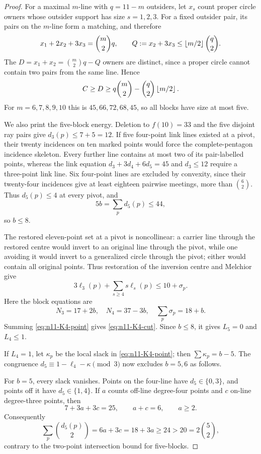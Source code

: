 \begin{proof}
For a maximal $m$-line with $q=11-m$ outsiders, let $x_s$ count proper
circle owners whose outsider support has size $s=1,2,3$.  For a fixed
outsider pair, its pairs on the $m$-line form a matching, and therefore
\[
x_1+2x_2+3x_3=\binom m2q,\qquad
Q:=x_2+3x_3\le\left\lfloor m/2\right\rfloor\binom q2.
\]
The $D=x_1+x_2=\binom m2q-Q$ owners are distinct, since a proper circle
cannot contain two pairs from the same line.  Hence
\[
C\ge D\ge q\binom m2-\binom q2\left\lfloor m/2\right\rfloor.
\]
For $m=6,7,8,9,10$ this is $45,66,72,68,45$, so all blocks have size at
most five.

We also print the five-block energy.  Deletion to $f(10)=33$ and the five
disjoint ray pairs give $d_3(p)\le7+5=12$.  If five four-point link lines
existed at a pivot, their twenty incidences on ten marked points would force
the complete-pentagon incidence skeleton.  Every further line contains at
most two of its pair-labelled points, whereas the link equation
\(d_3+3d_4+6d_5=45\) and $d_3\le12$ require a three-point link line.
Six four-point lines are excluded by convexity, since their twenty-four
incidences give at least eighteen pairwise meetings, more than
\(\binom62\).  Thus $d_5(p)\le4$ at every pivot, and
\[
5b=\sum_pd_5(p)\le44,
\]
so $b\le8$.

The restored eleven-point set at a pivot is noncollinear: a carrier line
through the restored centre would invert to an original line through the
pivot, while one avoiding it would invert to a generalized circle through
the pivot; either would contain all original points.  Thus restoration of
the inversion centre and Melchior give
\begin{equation}\label{eq:n11-K4-point}
3\ell_3(p)+\sum_{s\ge4}s\ell_s(p)\le10+\sigma_p.
\end{equation}
Here the block equations are
\[
N_3=17+2b,\quad N_4=37-3b,\quad
\sum_p\sigma_p=18+b.
\]
Summing \eqref{eq:n11-K4-point} gives \eqref{eq:n11-K4-cut}.  Since
$b\le8$, it gives $L_5=0$ and $L_4\le1$.

If $L_4=1$, let $\kappa_p$ be the local slack in
\eqref{eq:n11-K4-point}; then $\sum\kappa_p=b-5$.  The congruence
$d_5\equiv1-\ell_4-\kappa\pmod3$ now excludes $b=5,6$ as follows.

For $b=5$, every slack vanishes.  Points on the four-line have
$d_5\in\{0,3\}$, and points off it have $d_5\in\{1,4\}$.  If $a$ counts
off-line degree-four points and $c$ on-line degree-three points, then
\[
 7+3a+3c=25,\qquad a+c=6,\qquad a\ge2.
\]
Consequently
\[
 \sum_p\binom{d_5(p)}2=6a+3c=18+3a\ge24
 >20=2\binom52,
\]
contrary to the two-point intersection bound for five-blocks.


\end{proof}
